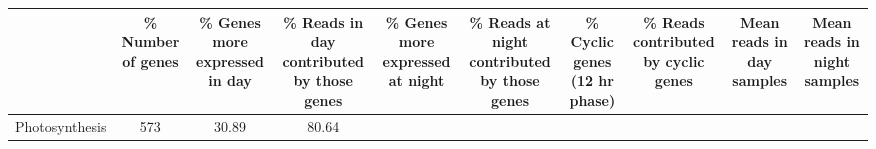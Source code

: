 \documentclass[]{article}
\begin{document}
\begin{longtable}[]{@{}lccccccccc@{}}
\toprule
\begin{minipage}[b]{0.07\columnwidth}\raggedright\strut
\strut
\end{minipage} & \begin{minipage}[b]{0.06\columnwidth}\centering\strut
\% Number of genes\strut
\end{minipage} & \begin{minipage}[b]{0.08\columnwidth}\centering\strut
\% Genes more expressed in day\strut
\end{minipage} & \begin{minipage}[b]{0.08\columnwidth}\centering\strut
\% Reads in day contributed by those genes\strut
\end{minipage} & \begin{minipage}[b]{0.08\columnwidth}\centering\strut
\% Genes more expressed at night\strut
\end{minipage} & \begin{minipage}[b]{0.08\columnwidth}\centering\strut
\% Reads at night contributed by those genes\strut
\end{minipage} & \begin{minipage}[b]{0.08\columnwidth}\centering\strut
\% Cyclic genes (12 hr phase)\strut
\end{minipage} & \begin{minipage}[b]{0.08\columnwidth}\centering\strut
\% Reads contributed by cyclic genes\strut
\end{minipage} & \begin{minipage}[b]{0.08\columnwidth}\centering\strut
Mean reads in day samples\strut
\end{minipage} & \begin{minipage}[b]{0.08\columnwidth}\centering\strut
Mean reads in night samples\strut
\end{minipage}\tabularnewline
\midrule
\endhead
\begin{minipage}[t]{0.07\columnwidth}\raggedright\strut
Photosynthesis\strut
\end{minipage} & \begin{minipage}[t]{0.06\columnwidth}\centering\strut
573\strut
\end{minipage} & \begin{minipage}[t]{0.08\columnwidth}\centering\strut
30.89\strut
\end{minipage} & \begin{minipage}[t]{0.08\columnwidth}\centering\strut
80.64\strut
\end{minipage} & \begin{minipage}[t]{0.08\columnwidth}\centering\strut

\end{minipage}
\end{longtable}
\end{document}
